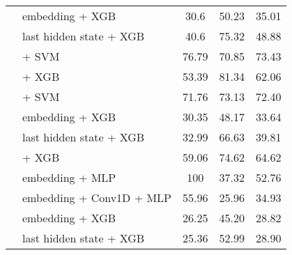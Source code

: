 \begin{longtable}{llccc}
                                       & \citep{DBLP:journals/corr/abs-1810-04805} embedding + XGB          & 30.6                                 & 50.23              & 35.01             \\
                                       & \citep{DBLP:journals/corr/abs-1810-04805} last hidden state + XGB  & 40.6                                 & 75.32              & 48.88             \\
                                       & \citep{wang2024multilingual} + SVM                                 & 76.79                                & 70.85              & 73.43             \\
                                       & \citep{zhang2025jasperstelladistillationsota} + XGB                & 53.39                                & 81.34              & 62.06             \\
                                       & \citep{zhang2025jasperstelladistillationsota} + SVM                & 71.76                                & 73.13              & 72.40             \\
                                       & \citep{DBLP:journals/corr/abs-1907-11692} embedding + XGB          & 30.35                                & 48.17              & 33.64             \\
                                       & \citep{DBLP:journals/corr/abs-1907-11692} last hidden state + XGB  & 32.99                                & 66.63              & 39.81             \\
                                       & \citep{ni2021sentencet5scalablesentenceencoders} + XGB             & 59.06                                & 74.62              & 64.62             \\
                                       & \citep{DBLP:journals/corr/abs-1911-02116} embedding + MLP          & 100                                  & 37.32              & 52.76             \\
                                       & \citep{DBLP:journals/corr/abs-1911-02116} embedding + Conv1D + MLP & 55.96                                & 25.96              & 34.93             \\
                                       & \citep{DBLP:journals/corr/abs-1911-02116} embedding + XGB          & 26.25                                & 45.20              & 28.82             \\
                                       & \citep{DBLP:journals/corr/abs-1911-02116} last hidden state + XGB  & 25.36                                & 52.99              & 28.90             \\

\end{longtable}

